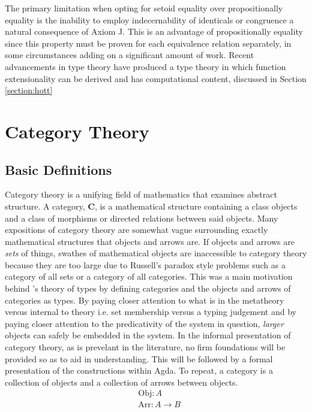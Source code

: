 The primary limitation when opting for setoid equality over propositionally
equality is the inability to employ indecernability of identicals or congruence
a natural consequence of \textsf{Axiom J}. This is an advantage of
propositionally equality since this property must be proven for each equivalence
relation separately, in some circumstances adding on a significant amount of
work. Recent advancements in type theory have produced a type theory in which
function extensionality can be derived and has computational content, discussed
in Section \ref{section:hott}

\section{Category Theory}

\subsection{Basic Definitions}
Category theory is a unifying field of mathematics that examines abstract
structure. A category, \textbf{C}, is a mathematical structure containing a
class objects and a class of morphisms or directed relations between said
objects. Many expositions of category theory are somewhat vague surrounding
exactly mathematical structures that objects and arrows are. If objects and
arrows are \textit{sets} of things, swathes of mathematical objects are
inaccessible to category theory because they are too large due to Russell's
paradox style problems such as a category of all sets or a category of all
categories. This was a main motivation behind \mlt's theory of types by
defining categories and the objects and arrows of categories as types. By paying
closer attention to what is in the metatheory versus internal to theory i.e. set
membership versus a typing judgement and by paying closer attention to the
predicativity of the system in question, \textit{larger} objects can safely be
embedded in the system. In the informal presentation of
category theory, as is prevelant in the literature, no firm foundations will be
provided so as to aid in understanding. This will be followed by a formal
presentation of the constructions within Agda. To repeat, a category is a
collection of objects and a collection of arrows between objects.
\begin{align*}
    &\textrm{Obj} : A \\
    &\textrm{Arr} : A \rightarrow B
\end{align*}

